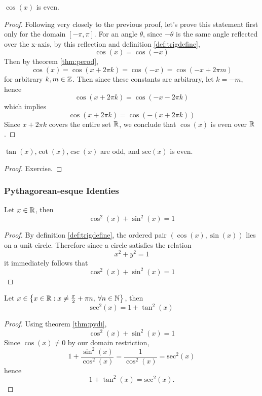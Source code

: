 \begin{theorem}
	$\cos(x)$ is even.
	\label{thm:coseven}
\end{theorem}
\begin{proof}
	Following very closely to the previous proof, let's prove this statement first only for the domain $[-\pi,\pi]$.
	For an angle $\theta$, since $-\theta$ is the same angle reflected over the x-axis, by this reflection and definition \eqref{def:trigdefine},
	$$\cos(x)=\cos(-x)$$
	Then by theorem \eqref{thm:perod},
	$$\cos(x)=\cos(x+2\pi k)=\cos(-x)=\cos(-x+2\pi m)$$
	for arbitrary $k,m\in\mathbb{Z}$. Then since these constants are arbitrary, let $k=-m$, hence
	$$\cos(x+2\pi k)=\cos(-x-2\pi k)$$
	which implies
	$$\cos(x+2\pi k)=\cos(-(x+2\pi k))$$
	Since $x+2\pi k$ covers the entire set $\mathbb{R}$, we conclude that $\cos(x)$ is even over $\mathbb{R}$.
\end{proof}

\begin{cor}
	$\tan(x)$,$\cot(x)$,$\csc(x)$ are odd, and $\text{sec}(x)$ is even.
\end{cor}
\begin{proof}
	Exercise.
\end{proof}



\subsubsection{Pythagorean-esque Identies}
\begin{theorem}
\label{thm:pydi}
Let $x\in\mathbb{R}$, then
$$\cos^2(x)+\sin^2(x)=1$$
\end{theorem}
\begin{proof}
	By definition \eqref{def:trigdefine}, the ordered pair $(\cos(x),\sin(x))$ lies on a unit circle. Therefore since a circle satisfies the relation
	$$x^2+y^2=1$$
	it immediately follows that
	$$\cos^2(x)+\sin^2(x)=1$$
\end{proof}
\begin{cor}
Let $x\in \left\{x\in\mathbb{R}: x\neq \frac{\pi}{2}+\pi n, \:
\forall n\in\mathbb{N}\right\}$, then
$$\text{sec}^2(x)=1+\tan^2(x)$$
\end{cor}
\begin{proof}
	Using theorem \eqref{thm:pydi},
	$$\cos^2(x)+\sin^2(x)=1$$
	Since $\cos(x)\neq0$ by our domain restriction,
	$$1+\frac{\sin^2(x)}{\cos^2(x)}=\frac{1}{\cos^2(x)}=\text{sec}^2(x)$$
	hence
	$$1+\tan^2(x)=\text{sec}^2(x).$$
\end{proof}

